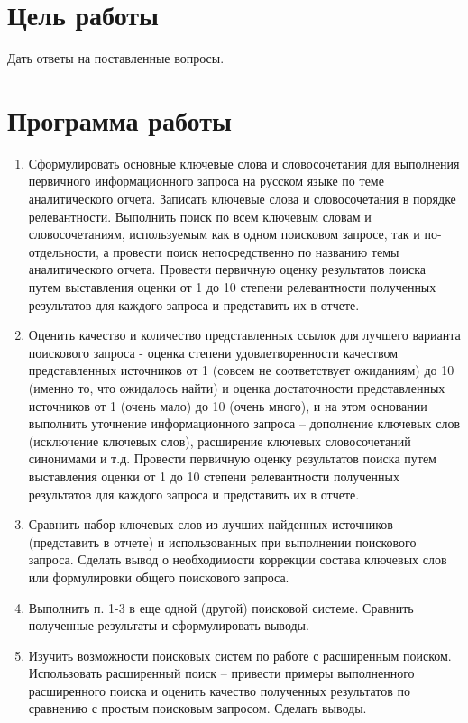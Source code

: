\documentclass[14pt,a4paper,report]{report}
\begin{document}
\section{Цель работы}

Дать ответы на поставленные вопросы.

\section{Программа работы}

\begin{enumerate}
	\item Сформулировать основные ключевые слова и словосочетания для выполнения первичного информационного запроса на русском языке по теме аналитического отчета. Записать ключевые слова и словосочетания в порядке релевантности. Выполнить поиск по всем ключевым словам и словосочетаниям, используемым как в одном поисковом запросе, так и по-отдельности, а провести поиск непосредственно по названию темы аналитического отчета. Провести первичную оценку результатов поиска путем выставления оценки от 1 до 10 степени релевантности полученных результатов для каждого запроса и представить их в отчете.
	
	\item Оценить качество и количество представленных ссылок для лучшего варианта поискового запроса - оценка степени удовлетворенности качеством представленных источников от 1 (совсем не соответствует ожиданиям) до 10 (именно то, что ожидалось найти) и оценка достаточности представленных источников от 1 (очень мало) до 10 (очень много), и на этом основании выполнить уточнение информационного запроса – дополнение ключевых слов (исключение ключевых слов), расширение ключевых словосочетаний синонимами и т.д. Провести первичную оценку результатов поиска путем выставления оценки от 1 до 10 степени релевантности полученных результатов для каждого запроса и представить их в отчете.
	
	\item Сравнить набор ключевых слов из лучших найденных источников (представить в отчете) и использованных при выполнении поискового запроса. Сделать вывод о необходимости коррекции состава ключевых слов или формулировки общего поискового запроса.
	
	\item Выполнить п. 1-3 в еще одной (другой) поисковой системе. Сравнить полученные результаты и сформулировать выводы.
	
	\item Изучить возможности поисковых систем по работе с расширенным поиском. Использовать расширенный поиск – привести примеры выполненного расширенного поиска и оценить качество полученных результатов по сравнению с простым поисковым запросом. Сделать выводы.
	

\end{enumerate}
\end{document}
